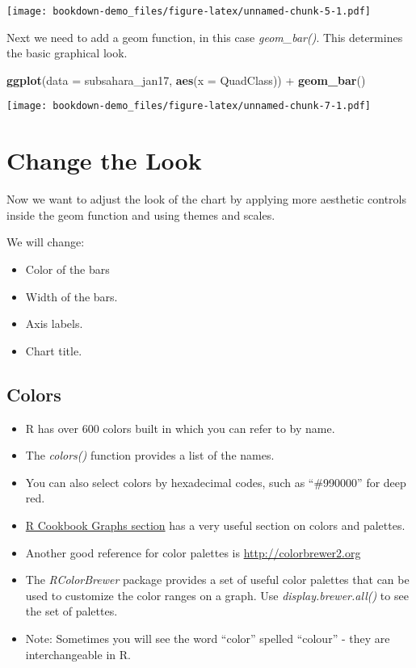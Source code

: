 \documentclass[]{book}
\newenvironment{Shaded}{\begin{snugshade}}{\end{snugshade}}
\newcommand{\KeywordTok}[1]{\textcolor[rgb]{0.13,0.29,0.53}{\textbf{{#1}}}}
\newcommand{\DataTypeTok}[1]{\textcolor[rgb]{0.13,0.29,0.53}{{#1}}}
\newcommand{\StringTok}[1]{\textcolor[rgb]{0.31,0.60,0.02}{{#1}}}
\newcommand{\NormalTok}[1]{{#1}}
\theoremstyle{definition}
\theoremstyle{definition}
\theoremstyle{remark}
\begin{document}
\texttt{[image: bookdown-demo\_files/figure-latex/unnamed-chunk-5-1.pdf]}

Next we need to add a geom function, in this case \emph{geom\_bar()}.
This determines the basic graphical look.

\begin{Shaded}
\begin{Highlighting}[]
\KeywordTok{ggplot}\NormalTok{(}\DataTypeTok{data =} \NormalTok{subsahara_jan17, }\KeywordTok{aes}\NormalTok{(}\DataTypeTok{x =} \NormalTok{QuadClass)) +}
\StringTok{  }\KeywordTok{geom_bar}\NormalTok{()}
\end{Highlighting}
\end{Shaded}

\texttt{[image: bookdown-demo\_files/figure-latex/unnamed-chunk-7-1.pdf]}

\chapter{Change the Look}\label{change-the-look}

Now we want to adjust the look of the chart by applying more aesthetic
controls inside the geom function and using themes and scales.

We will change:

\begin{itemize}
\item
  Color of the bars
\item
  Width of the bars.
\item
  Axis labels.
\item
  Chart title.
\end{itemize}

\section{Colors}\label{colors}

\begin{itemize}
\item
  R has over 600 colors built in which you can refer to by name.
\item
  The \emph{colors()} function provides a list of the names.
\item
  You can also select colors by hexadecimal codes, such as ``\#990000''
  for deep red.
\item
  \href{http://www.cookbook-r.com/Graphs/Colors_(ggplot2)/}{R Cookbook
  Graphs section} has a very useful section on colors and palettes.
\item
  Another good reference for color palettes is
  \url{http://colorbrewer2.org}
\item
  The \emph{RColorBrewer} package provides a set of useful color
  palettes that can be used to customize the color ranges on a graph.
  Use \emph{display.brewer.all()} to see the set of palettes.
\item
  Note: Sometimes you will see the word ``color'' spelled ``colour'' -
  they are interchangeable in R.
\end{itemize}
\end{document}
